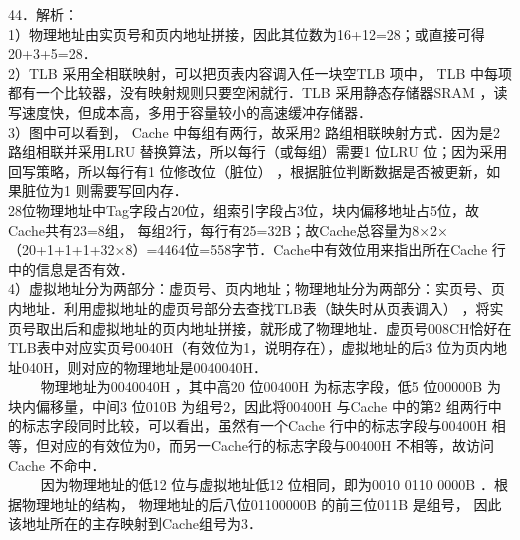 44．解析： \\
1）物理地址由实页号和页内地址拼接，因此其位数为16+12=28；或直接可得20+3+5=28． \\
2）TLB 采用全相联映射，可以把页表内容调入任一块空TLB 项中， TLB 中每项都有一个比较器，没有映射规则只要空闲就行．TLB 采用静态存储器SRAM ，读写速度快，但成本高，多用于容量较小的高速缓冲存储器． \\
3）图中可以看到， Cache 中每组有两行，故采用2 路组相联映射方式．因为是2 路组相联并采用LRU 替换算法，所以每行（或每组）需要1 位LRU 位；因为采用回写策略，所以每行有1 位修改位（脏位） ，根据脏位判断数据是否被更新，如果脏位为1 则需要写回内存． \\
28位物理地址中Tag字段占20位，组索引字段占3位，块内偏移地址占5位，故Cache共有23=8组， 每组2行，每行有25=32B；故Cache总容量为8×2×（20+1+1+1+32×8）=4464位=558字节．Cache中有效位用来指出所在Cache 行中的信息是否有效． \\
4）虚拟地址分为两部分：虚页号、页内地址；物理地址分为两部分：实页号、页内地址．利用虚拟地址的虚页号部分去查找TLB表（缺失时从页表调入） ，将实页号取出后和虚拟地址的页内地址拼接，就形成了物理地址．虚页号008CH恰好在TLB表中对应实页号0040H（有效位为1，说明存在），虚拟地址的后3 位为页内地址040H，则对应的物理地址是0040040H． \\
$\qquad$ 物理地址为0040040H ，其中高20 位00400H 为标志字段，低5 位00000B 为块内偏移量，中间3 位010B 为组号2，因此将00400H 与Cache 中的第2 组两行中的标志字段同时比较，可以看出，虽然有一个Cache 行中的标志字段与00400H 相等，但对应的有效位为0，而另一Cache行的标志字段与00400H 不相等，故访问Cache 不命中． \\
$\qquad$ 因为物理地址的低12 位与虚拟地址低12 位相同，即为0010 0110 0000B ．根据物理地址的结构， 物理地址的后八位01100000B 的前三位011B 是组号， 因此该地址所在的主存映射到Cache组号为3．